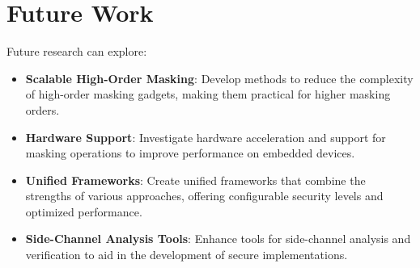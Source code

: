 \section{Future Work}

Future research can explore:

\begin{itemize}
    \item \textbf{Scalable High-Order Masking}: Develop methods to reduce the complexity of high-order masking gadgets, making them practical for higher masking orders.
    \item \textbf{Hardware Support}: Investigate hardware acceleration and support for masking operations to improve performance on embedded devices.
    \item \textbf{Unified Frameworks}: Create unified frameworks that combine the strengths of various approaches, offering configurable security levels and optimized performance.
    \item \textbf{Side-Channel Analysis Tools}: Enhance tools for side-channel analysis and verification to aid in the development of secure implementations.
\end{itemize}